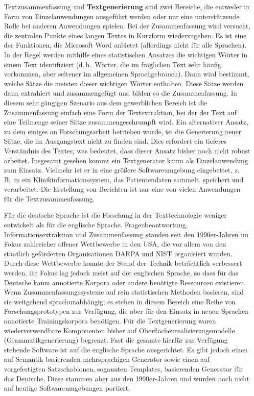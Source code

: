 \begin{multicols}{2}
Textzusammenfassung und \textbf{Textgenerierung} sind zwei Bereiche, die entweder in Form von Einzelanwendungen ausgeführt werden oder nur eine unterstützende Rolle bei anderen Anwendungen spielen. Bei der Zusammenfassung wird versucht, die zentralen Punkte eines langen Textes in Kurzform wiederzugeben. Es ist eine der Funktionen, die Microsoft Word anbietet (allerdings nicht für alle Sprachen). In der Regel werden mithilfe eines statistischen Ansatzes die wichtigen Wörter in einem Text identifiziert (d.\,h.~Wörter, die im fraglichen Text sehr häufig vorkommen, aber seltener im allgemeinen Sprachgebrauch). Dann wird bestimmt, welche Sätze die meisten dieser wichtigen Wörter enthalten. Diese Sätze werden dann extrahiert und zusammengefügt und bilden so die Zusammenfassung. In diesem sehr gängigen Szenario aus dem gewerblichen Bereich ist die Zusammenfassung einfach eine Form der Textextraktion, bei der der Text auf eine Teilmenge seiner Sätze zusammengeschrumpft wird. Ein alternativer Ansatz, zu dem einiges an Forschungsarbeit betrieben wurde, ist die Generierung neuer Sätze, die im Ausgangstext nicht zu finden sind. 
Dies erfordert ein tieferes Verständnis des Textes, was bedeutet, dass dieser Ansatz bisher noch nicht robust arbeitet. Insgesamt gesehen kommt ein Textgenerator kaum als Einzelanwendung zum Einsatz. Vielmehr ist er in eine größere Softwareumgebung eingebettet, z.\,B.~in ein Klinikinformationssystem, das Patientendaten sammelt, speichert und verarbeitet. Die Erstellung von Berichten ist nur eine von vielen Anwendungen für die Textzusammenfassung. 


Für die deutsche Sprache ist die Forschung in der Texttechnologie weniger entwickelt als für die englische Sprache. Fragenbeantwortung, Informationsextraktion und Zusammenfassung standen seit den 1990er-Jahren im Fokus zahlreicher offener Wettbewerbe in den USA, die vor allem von den staatlich geförderten Organisationen DARPA und NIST organisiert wurden. Durch diese Wettbewerbe konnte der Stand der Technik beträchtlich verbessert werden, ihr Fokus lag jedoch meist auf der englischen Sprache, so dass für das Deutsche kaum annotierte Korpora oder andere benötigte Ressourcen existieren. Wenn Zusammenfassungssysteme auf rein statistischen Methoden basieren, sind sie weitgehend sprachunabhängig; es stehen in diesem Bereich eine Reihe von Forschungsprototypen zur Verfügung, 
die aber für den Einsatz in neuen Sprachen annotierte Trainingskorpora benötigen. 
Für die Textgenerierung waren wiederverwendbare Komponenten bisher auf Oberflächenrealisierungsmodelle (Grammatikgenerierung) begrenzt. Fast die gesamte hierfür zur Verfügung stehende Software ist auf die englische Sprache ausgerichtet. Es gibt jedoch einen auf Semantik basierenden mehrsprachigen Generator sowie einen auf
vorgefertigten Satzschablonen, sogannten Templates, 
basierenden Generator für das Deutsche. Diese stammen aber aus den 1990er-Jahren und wurden noch nicht auf heutige Softwareumgebungen portiert.


\end{multicols}
